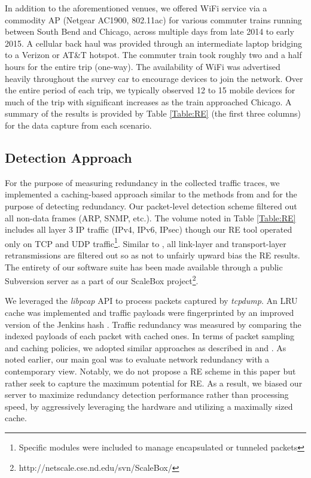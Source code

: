 \documentclass{sig-alternate}
\begin{document}
In addition to the aforementioned venues, we offered WiFi service via a commodity AP (Netgear AC1900, 802.11ac) for various commuter trains running between South Bend and Chicago, across multiple days from late 2014 to early 2015. A cellular back haul was provided through an intermediate laptop bridging to a Verizon or AT\&T hotspot. The commuter train took roughly two and a half hours for the entire trip (one-way). The availability of WiFi was advertised heavily throughout the survey car to encourage devices to join the network. Over the entire period of each trip, we typically observed 12 to 15 mobile devices for much of the trip with significant increases as the train approached Chicago. A summary of the results is provided by Table \ref{Table:RE} (the first three columns) for the data capture from each scenario. 

\subsection{Detection Approach}

For the purpose of measuring redundancy in the collected traffic traces, we implemented a caching-based approach similar to the methods from \cite{Spring:2000} and \cite{EndRE:2010} for the purpose of detecting redundancy. Our packet-level detection scheme filtered out all non-data frames (ARP, SNMP, etc.). The volume noted in Table \ref{Table:RE} includes all layer 3 IP traffic (IPv4, IPv6, IPsec) though our RE tool operated only on TCP and UDP traffic\footnote{Specific modules were included to manage encapsulated or tunneled packets}. Similar to \cite{Qian:2013}, all link-layer and transport-layer retransmissions are filtered out so as not to unfairly upward bias the RE results. The entirety of our software suite has been made available through a public Subversion server as a part of our ScaleBox project\footnote{http://netscale.cse.nd.edu/svn/ScaleBox/}.

We leveraged the \emph{libpcap} API to process packets captured by \emph{tcpdump}. An LRU cache was implemented and traffic payloads were fingerprinted by an improved version of the Jenkins hash \cite{SpookyHash}. Traffic redundancy was measured by comparing the indexed payloads of each packet with cached ones. In terms of packet sampling and caching policies, we adopted similar approaches as described in \cite{Spring:2000} and \cite{EndRE:2010}. As noted earlier, our main goal was to evaluate network redundancy with a contemporary view. Notably, we do not propose a RE scheme in this paper but rather seek to capture the maximum potential for RE. As a result, we biased our server to maximize redundancy detection performance rather than processing speed, by aggressively leveraging the hardware and utilizing a maximally sized cache. 
\end{document}
